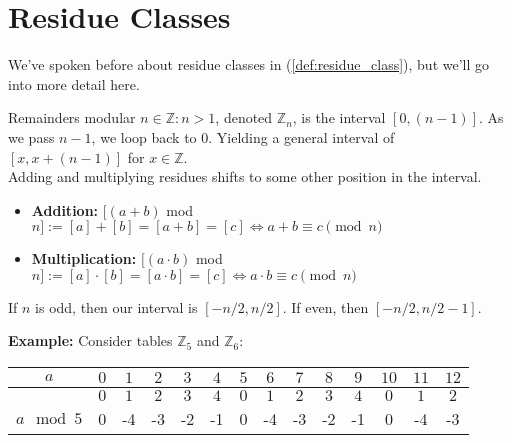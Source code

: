 \section{Residue Classes}
We've spoken before about residue classes in (\ref{def:residue_class}), 
but we'll go into more detail here.

\begin{theo}
   
    Remainders modular $n\in\mathbb{Z}:n>1$, denoted $\mathbb{Z}_n$, is the interval $[0,(n-1)]$.
    As we pass $n-1$, we loop back to $0$. Yielding a general interval of $[x,x+(n-1)]$ for $x\in\mathbb{Z}$.\\

    \noindent
    Adding and multiplying residues shifts to some other position in the interval.
    \begin{itemize}
        \item \textbf{Addition:} $[(a+b)$ mod $n]:=[a] + [b] = [a+b] = [c]\Longleftrightarrow a+b\equiv c\pmod{n}$
        \item \textbf{Multiplication:} $[(a\cdot b)$ mod $n]:=[a]\cdot[b] = [a\cdot b]=[c]\Longleftrightarrow a\cdot b\equiv c \pmod{n}$
    \end{itemize}

    \noindent
    If $n$ is odd, then our interval is $[-n/2,n/2]$. If even, then $[-n/2,n/2-1]$.
\end{theo}
\newpage
\noindent
\textbf{Example:} Consider tables $\mathbb{Z}_5$ and $\mathbb{Z}_6$:
\begin{table}[h!]
    \setlength{\tabcolsep}{10pt} %
    \renewcommand{\arraystretch}{1.2} %
    \centering
\begin{tabular}{|*{14}{c|}}
    
    
    \hline
   \cellcolor{white}$a$ & $0$ & $1$ & $2$ & \cellcolor{OliveGreen!40}$3$ &\cellcolor{OliveGreen!40} $4$ &\cellcolor{OliveGreen!40} $5$ &\cellcolor{OliveGreen!40} $6$ &\cellcolor{OliveGreen!40} $7$ & $8$ & $9$ & $10$ & $11$ & $12$ \\
    \hline
       & $0$ & $1$ & $2$ & $3$ & $4$ & \cellcolor{OliveGreen!20}$0$ &\cellcolor{OliveGreen!20} $1$ &\cellcolor{OliveGreen!20} $2$ & $3$ & $4$ & $0$ & $1$ & $2$ \\
    \cline{2-14}
    \multirow{-2}{*}{$a\mod 5$}&0&-4&-3&\cellcolor{OliveGreen!20}-2&\cellcolor{OliveGreen!20}-1&\cellcolor{OliveGreen!20}0&-4&-3&-2&-1&0&-4&-3\\
    \hline
\end{tabular}
\end{table}

